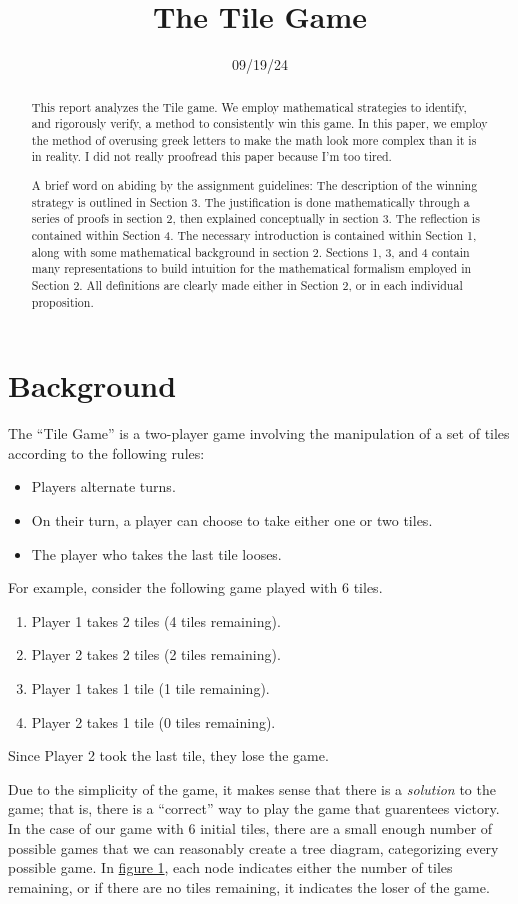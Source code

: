 \documentclass[11pt, letterpaper]{article}
\title{The Tile Game}
\date{09/19/24}
\begin{document}
\makereport
\begin{abstract}
	This report analyzes the Tile game. We employ mathematical strategies to identify, and rigorously verify, a method to consistently win this game. In this paper, we employ the method of overusing greek letters to make the math look more complex than it is in reality. I did not really proofread this paper because I'm too tired.

	A brief word on abiding by the assignment guidelines: The description of the winning strategy is outlined in Section 3. The justification is done mathematically through a series of proofs in section 2, then explained conceptually in section 3. The reflection is contained within Section 4. The necessary introduction is contained within Section 1, along with some mathematical background in section 2. Sections 1, 3, and 4 contain many representations to build intuition for the mathematical formalism employed in Section 2. All definitions are clearly made either in Section 2, or in each individual proposition.
\end{abstract}
\section{Background}
\label{sec:1}
The ``Tile Game'' is a two-player game involving the manipulation of a set of tiles according to the following rules:
\begin{itemize}
	\item Players alternate turns.
	\item On their turn, a player can choose to take either one or two tiles.
	\item The player who takes the last tile looses.
\end{itemize}
For example, consider the following game played with 6 tiles.
\begin{enumerate}
	\item Player 1 takes 2 tiles (4 tiles remaining).
	\item Player 2 takes 2 tiles (2 tiles remaining).
	\item Player 1 takes 1 tile (1 tile remaining).
	\item Player 2 takes 1 tile (0 tiles remaining).
\end{enumerate}
Since Player 2 took the last tile, they lose the game.

Due to the simplicity of the game, it makes sense that there is a \emph{solution} to the game; that is, there is a ``correct'' way to play the game that guarentees victory. In the case of our game with 6 initial tiles, there are a small enough number of possible games that we can reasonably create a tree diagram, categorizing every possible game. In \hyperlink{fig:1}{figure 1}, each node indicates either the number of tiles remaining, or if there are no tiles remaining, it indicates the loser of the game.
\end{document}
